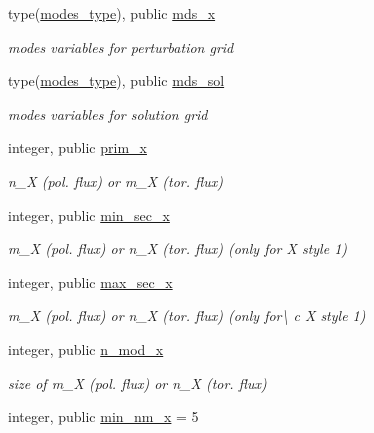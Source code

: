 \begin{DoxyCompactItemize}
\item 
type(\hyperlink{structx__vars_1_1modes__type}{modes\+\_\+type}), public \hyperlink{namespacex__vars_a690d4228d2a81ec5a7a6cd13be3a56a1}{mds\+\_\+x}
\begin{DoxyCompactList}\small\item\em modes variables for perturbation grid \end{DoxyCompactList}\item 
type(\hyperlink{structx__vars_1_1modes__type}{modes\+\_\+type}), public \hyperlink{namespacex__vars_ac74f59668de6caca7038decc7191c6a1}{mds\+\_\+sol}
\begin{DoxyCompactList}\small\item\em modes variables for solution grid \end{DoxyCompactList}\item 
integer, public \hyperlink{namespacex__vars_ae7f7061534fb3ad68a538cdcea20d1d9}{prim\+\_\+x}
\begin{DoxyCompactList}\small\item\em {\ttfamily n\+\_\+X} (pol. flux) or {\ttfamily m\+\_\+X} (tor. flux) \end{DoxyCompactList}\item 
integer, public \hyperlink{namespacex__vars_a0d63825aabc4c71623c6ea7ffe033949}{min\+\_\+sec\+\_\+x}
\begin{DoxyCompactList}\small\item\em {\ttfamily m\+\_\+X} (pol. flux) or {\ttfamily n\+\_\+X} (tor. flux) (only for {\ttfamily X} style 1) \end{DoxyCompactList}\item 
integer, public \hyperlink{namespacex__vars_ae19ca528c5688228ff20912a45290b2a}{max\+\_\+sec\+\_\+x}
\begin{DoxyCompactList}\small\item\em {\ttfamily m\+\_\+X} (pol. flux) or {\ttfamily n\+\_\+X} (tor. flux) (only for\textbackslash{} c X style 1) \end{DoxyCompactList}\item 
integer, public \hyperlink{namespacex__vars_a2e8fe6c5fe1cf61704bf176925d2b02e}{n\+\_\+mod\+\_\+x}
\begin{DoxyCompactList}\small\item\em size of {\ttfamily m\+\_\+X} (pol. flux) or {\ttfamily n\+\_\+X} (tor. flux) \end{DoxyCompactList}\item 
integer, public \hyperlink{namespacex__vars_adec89f548ba63e203297222dce675b94}{min\+\_\+nm\+\_\+x} = 5

\end{DoxyCompactItemize}
